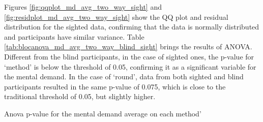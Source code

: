 %
%

Figures \ref{fig:qqplot_md_avg_two_way_sight} and \ref{fig:residplot_md_avg_two_way_sight} show the QQ plot and residual distribution for the sighted data, confirming that the data is normally distributed and participants have similar variance. Table \ref{tab:blocanova_md_avg_two_way_blind_sight} brings the results of ANOVA. Different from the blind participants, in the case of sighted ones, the p-value for ‘method’ is below the threshold of 0.05, confirming it as a significant variable for the mental demand. In the case of ‘round’, data from both sighted and blind participants resulted in the same p-value of 0.075, which is close to the traditional threshold of 0.05, but slightly higher. 

\begin{table}
    \caption{Anova p-value for the mental demand average on each method'}
    \label{tab:blocanova_md_avg_two_way_blind_sight}
\begin{minipage}{0.45\textwidth}
    
\end{minipage}
\begin{minipage}{0.45\textwidth}
        
\end{minipage}
\end{table}

